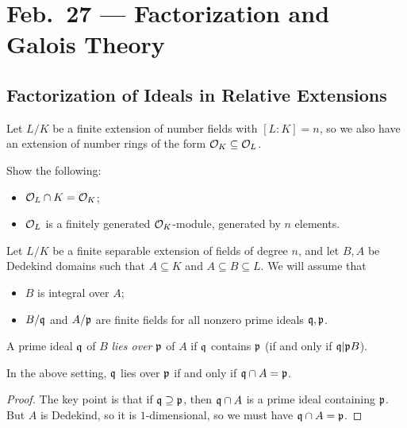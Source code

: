 \chapter{Feb.~27 --- Factorization and Galois Theory}

\section{Factorization of Ideals in Relative Extensions}

\begin{remark}
  Let $L / K$ be a finite extension of number fields
  with $[L : K] = n$, so we also have an extension
  of number rings of the form $\mathcal{O}_K \subseteq \mathcal{O}_L$.
\end{remark}

\begin{exercise}
  Show the following:
  \begin{itemize}
    \item $\mathcal{O}_L \cap K = \mathcal{O}_K$;
    \item $\mathcal{O}_L$ is a finitely generated $\mathcal{O}_K$-module,
      generated by $n$ elements.
  \end{itemize}
\end{exercise}

\begin{remark}
  Let $L / K$ be a finite separable extension of
  fields of degree $n$, and let $B, A$ be Dedekind
  domains such that $A \subseteq K$ and
  $A \subseteq B \subseteq L$. We will assume that
  \begin{itemize}
    \item $B$ is integral over $A$;
    \item $B / \mathfrak{q}$ and $A / \mathfrak{p}$ are finite fields
      for all nonzero prime ideals $\mathfrak{q}, \mathfrak{p}$.
  \end{itemize}
\end{remark}

\begin{definition}
  A prime ideal $\mathfrak{q}$ of $B$ \emph{lies over} $\mathfrak{p}$
  of $A$ if $\mathfrak{q}$ contains $\mathfrak{p}$ (if and only if $\mathfrak{q} | \mathfrak{p} B$).
\end{definition}

\begin{lemma}
  In the above setting, $\mathfrak{q}$ lies over $\mathfrak{p}$ if and only
  if $\mathfrak{q} \cap A = \mathfrak{p}$.
\end{lemma}

\begin{proof}
  The key point is that if $\mathfrak{q} \supseteq \mathfrak{p}$, then
  $\mathfrak{q} \cap A$ is a prime ideal containing $\mathfrak{p}$.
  But $A$ is Dedekind, so it is $1$-dimensional, so
  we must have $\mathfrak{q} \cap A = \mathfrak{p}$.
\end{proof}

